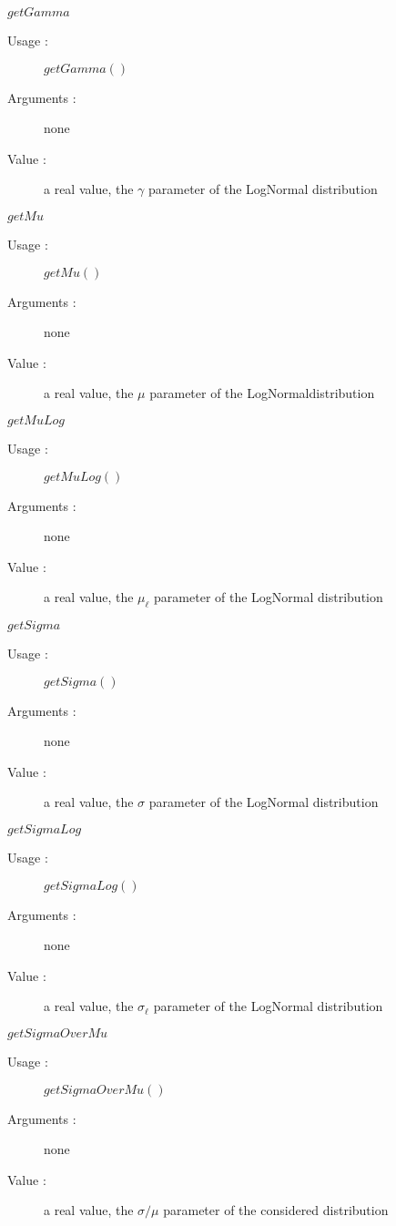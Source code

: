 \begin{description}
\begin{description}
  \item $getGamma$
    \begin{description}
    \item[Usage :] $getGamma()$
    \item[Arguments :] none
    \item[Value :]  a real value, the $\gamma$ parameter of the LogNormal distribution
    \end{description}
    \bigskip
  \item $getMu$
    \begin{description}
    \item[Usage :] $getMu()$
    \item[Arguments :] none
    \item[Value :]  a real value,  the $\mu$ parameter of the  LogNormaldistribution
    \end{description}
    \bigskip
  \item $getMuLog$
    \begin{description}
    \item[Usage :] $getMuLog()$
    \item[Arguments :] none
    \item[Value :]  a real value,  the $\mu_\ell$ parameter of the LogNormal distribution
    \end{description}
    \bigskip
  \item $getSigma$
    \begin{description}
    \item[Usage :] $getSigma()$
    \item[Arguments :] none
    \item[Value :]  a real value,  the $\sigma$ parameter of the LogNormal distribution
    \end{description}
    \bigskip
  \item $getSigmaLog$
    \begin{description}
    \item[Usage :] $getSigmaLog()$
    \item[Arguments :] none
    \item[Value :]  a real value,  the $\sigma_\ell$ parameter of the  LogNormal distribution
    \end{description}
    \bigskip

  \item $getSigmaOverMu$
    \begin{description}
    \item[Usage :] $getSigmaOverMu()$
    \item[Arguments :] none
    \item[Value :]  a real value, the  $\sigma/\mu$ parameter of the considered distribution
    \end{description}
  \end{description}


\end{description}
